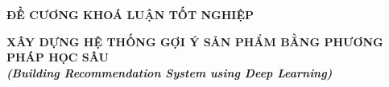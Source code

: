 \documentclass{article}[14pt]
\begin{document}
    \begin{figure}[h]
        \begin{floatrow}
        {%
    
        }
        {%
    
        }
        \end{floatrow}
    \end{figure}
    
    \begin{center}
        
        \textbf{\Large ĐỀ CƯƠNG KHOÁ LUẬN TỐT NGHIỆP} \\ 
    \end{center}
    
    
    \begin{center}
            
            \textbf{\huge  XÂY DỰNG HỆ THỐNG GỢI Ý SẢN PHẨM BẰNG PHƯƠNG PHÁP HỌC 
    SÂU} \\
            
        \vspace{.5cm}
            \textit{\textbf{\Large (Building Recommendation System using Deep 
    Learning)}}
        \end{center}
    \vspace{.5cm}
    
\end{document}
